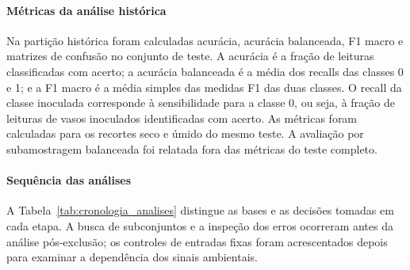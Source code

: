 \paragraph{Métricas da análise histórica}
\label{subsec:metricas}

Na partição histórica foram calculadas acurácia, acurácia balanceada,
F1 macro e matrizes de confusão no conjunto de teste. A acurácia é a
fração de leituras
classificadas com acerto; a acurácia balanceada é a média dos recalls
das classes 0 e 1; e a F1 macro é a média simples das medidas F1 das duas
classes. O recall da classe inoculada corresponde à sensibilidade
para a classe 0, ou seja, à fração de leituras de vasos inoculados
identificadas com acerto. As métricas foram calculadas para os recortes seco e
úmido do mesmo teste. A avaliação por subamostragem balanceada foi relatada
fora das métricas do teste completo.

\paragraph{Sequência das análises}
\label{subsec:sequencia_analises}

A Tabela~\ref{tab:cronologia_analises} distingue as bases e as decisões
tomadas em cada etapa. A busca de subconjuntos e a inspeção dos erros
ocorreram antes da análise pós-exclusão; os controles de entradas fixas
foram acrescentados depois para examinar a dependência dos
sinais ambientais.

